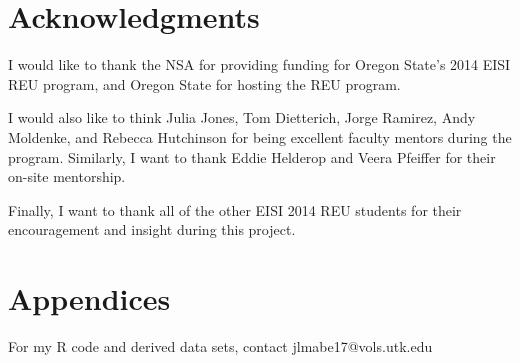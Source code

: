 \documentclass[twocolumn]{article}
\begin{document}
\section{Acknowledgments}
I would like to thank the NSA for providing funding for Oregon State's 2014 EISI REU program, 
and Oregon State for hosting the REU program.

I would also like to think Julia Jones, Tom Dietterich, Jorge Ramirez, Andy Moldenke, and Rebecca Hutchinson for being excellent faculty
mentors during the program. Similarly, I want to thank Eddie Helderop and Veera Pfeiffer for their on-site mentorship.

Finally, I want to thank all of the other EISI 2014 REU students for their encouragement and insight during this project.
\nocite{Hmisc}
\nocite{R}
\nocite{dormann2009indices}



\appendix
\section{Appendices}

For my R code and derived data sets, contact jlmabe17@vols.utk.edu
\end{document}
